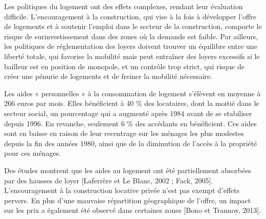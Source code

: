 \documentclass[a4paper, 12pt]{report}
\begin{document}
Les politiques du logement ont des effets complexes, rendant leur évaluation difficile. L’encouragement à la construction, qui vise à la fois à développer l’offre de logements et à soutenir l’emploi dans le secteur de la construction, comporte le risque de surinvestissement dans des zones où la demande est faible. Par ailleurs, les politiques de réglementation des loyers doivent trouver un équilibre entre une liberté totale, qui favorise la mobilité mais peut entraîner des loyers excessifs si le bailleur est en position de monopole, et un contrôle trop strict, qui risque de créer une pénurie de logements et de freiner la mobilité nécessaire.

Les aides « personnelles » à la consommation de logement s'élèvent en moyenne à 266 euros par mois. Elles bénéficient à 40 \% des locataires, dont la moitié dans le secteur social, un pourcentage qui a augmenté après 1984 avant de se stabiliser depuis 1996. En revanche, seulement 6 \% des accédants en bénéficient. Ces aides sont en baisse en raison de leur recentrage sur les ménages les plus modestes depuis la fin des années 1980, ainsi que de la diminution de l'accès à la propriété pour ces ménages.

Des études montrent que les aides au logement ont été partiellement absorbées par des hausses de loyer [Laferrère et Le Blanc, 2002 ; Fack, 2005]. L’encouragement à la construction locative privée n’est pas exempt d’effets pervers. En plus d'une mauvaise répartition géographique de l'offre, un impact sur les prix a également été observé dans certaines zones [Bono et Trannoy, 2013].
\end{document}
